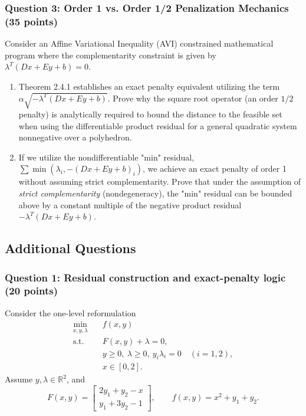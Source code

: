 \documentclass[pdflatex,sn-mathphys-num]{sn-jnl}%
\theoremstyle{definition}
\newcommand{\R}{\mathbb{R}}
\begin{document}
\subsubsection*{Question 3: Order 1 vs. Order 1/2 Penalization Mechanics (35 points)}
Consider an Affine Variational Inequality (AVI) constrained mathematical program where the complementarity constraint is given by $\lambda^T(Dx + Ey + b) = 0$. 

\begin{enumerate}
    \item[(a)] Theorem 2.4.1 establishes an exact penalty equivalent utilizing the term $\alpha \sqrt{-\lambda^T(Dx + Ey + b)}$. Prove why the square root operator (an order $1/2$ penalty) is analytically required to bound the distance to the feasible set when using the differentiable product residual for a general quadratic system nonnegative over a polyhedron.
    \item[(b)] If we utilize the nondifferentiable "min" residual, $\sum \min(\lambda_i, -(Dx+Ey+b)_i)$, we achieve an exact penalty of order 1 without assuming strict complementarity. Prove that under the assumption of \textit{strict complementarity} (nondegeneracy), the "min" residual can be bounded above by a constant multiple of the negative product residual $-\lambda^T(Dx + Ey + b)$.
\end{enumerate}

\subsection{Additional Questions}
\subsubsection*{Question 1: Residual construction and exact-penalty logic (20 points)}

Consider the one-level reformulation
\[
\begin{aligned}
\min_{x,y,\lambda}\quad & f(x,y) \\
\text{s.t.}\quad
& F(x,y)+\lambda=0,\\
& y\ge 0,\ \lambda\ge 0,\ y_i\lambda_i=0 \quad (i=1,2),\\
& x\in [0,2].
\end{aligned}
\]
Assume \(y,\lambda\in\R^2\), and
\[
F(x,y)=
\begin{bmatrix}
2y_1+y_2-x\\
y_1+3y_2-1
\end{bmatrix},
\qquad
f(x,y)=x^2+y_1+y_2.
\]
\end{document}
